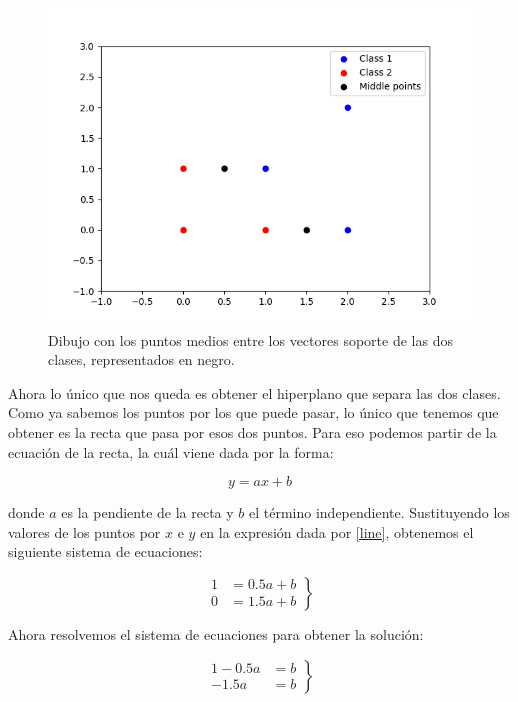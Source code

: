 \documentclass[11pt,a4paper]{article}
\begin{document}
\begin{figure}[H]
\centering
\includegraphics[scale=0.6]{img/middle.png}
\caption{Dibujo con los puntos medios entre los vectores soporte de las dos clases, representados en negro.}
\end{figure}

Ahora lo único que nos queda es obtener el hiperplano que separa las dos clases. Como ya sabemos los puntos por los que puede pasar,
lo único que tenemos que obtener es la recta que pasa por esos dos puntos. Para eso podemos partir de la ecuación de la recta, la cuál
viene dada por la forma:

\begin{equation}
\label{line}
y = ax + b
\end{equation}

\noindent donde $a$ es la pendiente de la recta y $b$ el término independiente. Sustituyendo los valores de los puntos por $x$ e $y$
en la expresión dada por \eqref{line}, obtenemos el siguiente sistema de ecuaciones:

\begin{equation}
\left.
\begin{aligned}
	1 &= 0.5a + b \\
	0 &= 1.5a + b
\end{aligned}
\right\rbrace
\end{equation}

Ahora resolvemos el sistema de ecuaciones para obtener la solución:

\begin{equation}
\left.
\begin{aligned}
	1 - 0.5a &= b \\
	-1.5a&= b
\end{aligned}
\right\rbrace
\end{equation}
\end{document}

